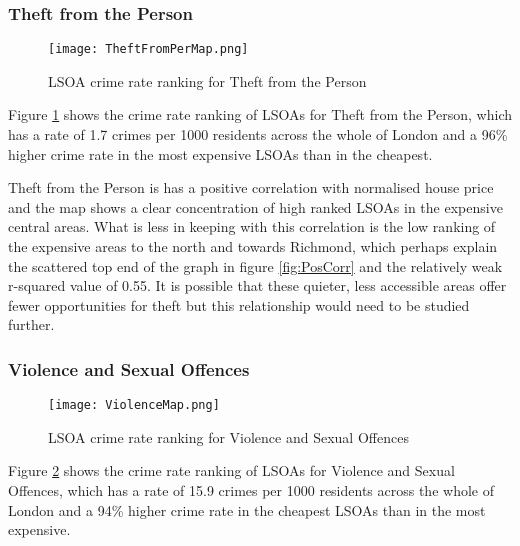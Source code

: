 \documentclass{article}
\begin{document}
\subsubsection{Theft from the Person}
\begin{figure}[H]
\begin{center}
  \texttt{[image: TheftFromPerMap.png]}
  \caption{LSOA crime rate ranking for Theft from the Person}
  \label{fig:TheftFromPerMap}
\end{center}
\end{figure}

Figure \ref{fig:TheftFromPerMap} shows the crime rate ranking of LSOAs for Theft from the Person, which has a rate of 1.7 crimes per 1000 residents across the whole of London and a 96\% higher crime rate in the most expensive LSOAs than in the cheapest.
\newline 

Theft from the Person is has a positive correlation with normalised house price and the map shows a clear concentration of high ranked LSOAs in the expensive central areas. What is less in keeping with this correlation is the low ranking of the expensive areas to the north and towards Richmond, which perhaps explain the scattered top end of the graph in figure \ref{fig:PosCorr} and the relatively weak r-squared value of 0.55. It is possible that these quieter, less accessible areas offer fewer opportunities for theft but this relationship would need to be studied further.
\newline

\subsubsection{Violence and Sexual Offences}
\begin{figure}[H]
\begin{center}
  \texttt{[image: ViolenceMap.png]}
  \caption{LSOA crime rate ranking for Violence and Sexual Offences}
  \label{fig:ViolenceMap}
\end{center}
\end{figure}

Figure \ref{fig:ViolenceMap} shows the crime rate ranking of LSOAs for Violence and Sexual Offences, which has a rate of 15.9 crimes per 1000 residents across the whole of London and a 94\% higher crime rate in the cheapest LSOAs than in the most expensive.
\newline 
\end{document}
